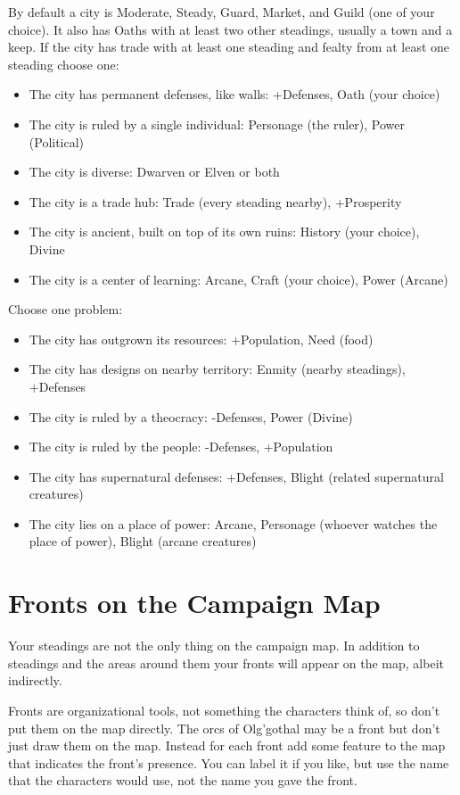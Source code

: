  By default a city is Moderate, Steady, Guard, Market, and Guild (one of your choice). It also has Oaths with at least two other steadings, usually a town and a keep. If the city has trade with at least one steading and fealty from at least one steading choose one:
\begin{itemize}
\item The city has permanent defenses, like walls: +Defenses, Oath (your choice)
\item The city is ruled by a single individual: Personage (the ruler), Power (Political)
\item The city is diverse: Dwarven or Elven or both
\item The city is a trade hub: Trade (every steading nearby), +Prosperity
\item The city is ancient, built on top of its own ruins: History (your choice), Divine
\item The city is a center of learning: Arcane, Craft (your choice), Power (Arcane)

\end{itemize}


 Choose one problem:
\begin{itemize}
\item The city has outgrown its resources: +Population, Need (food)
\item The city has designs on nearby territory: Enmity (nearby steadings), +Defenses
\item The city is ruled by a theocracy: -Defenses, Power (Divine)
\item The city is ruled by the people: -Defenses, +Population
\item The city has supernatural defenses: +Defenses, Blight (related supernatural creatures)
\item The city lies on a place of power: Arcane, Personage (whoever watches the place of power), Blight (arcane creatures)

\end{itemize}
\section{Fronts on the Campaign Map}


 Your steadings are not the only thing on the campaign map. In addition to steadings and the areas around them your fronts will appear on the map, albeit indirectly.


 Fronts are organizational tools, not something the characters think of, so don't put them on the map directly. The orcs of Olg'gothal may be a front but don't just draw them on the map. Instead for each front add some feature to the map that indicates the front's presence. You can label it if you like, but use the name that the characters would use, not the name you gave the front.


